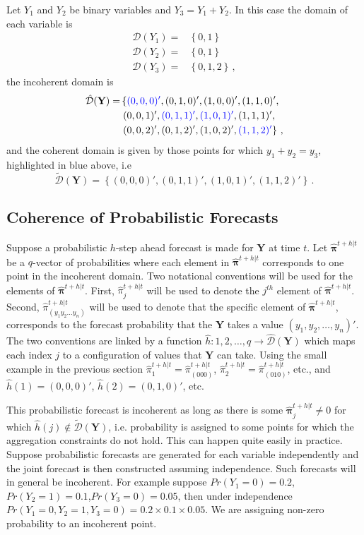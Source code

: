 \documentclass[a4paper,review,12pt,authoryear]{elsarticle}
\newcommand{\bY}{\mathbf{Y}}
\newcommand{\bpi}{\bm{\pi}}
\begin{document}
    Let $Y_1$ and $Y_2$ be binary variables and $Y_3=Y_1+Y_2$. In this case the domain of each variable is
    \begin{align*}
      \mathcal{D}(Y_1)=&\left\{0,1\right\}\\
      \mathcal{D}(Y_2)=&\left\{0,1\right\}\\
      \mathcal{D}(Y_3)=&\left\{0,1,2\right\}\,,
    \end{align*}	
    the incoherent domain is
    \begin{align*}
    \hat{\mathcal D}(\bY)=&\left\{\textcolor{blue}{(0,0,0)'},(0,1,0)',(1,0,0)',(1,1,0)',\right.\\
    &\left.(0,0,1)',\textcolor{blue}{(0,1,1)'},\textcolor{blue}{(1,0,1)'},(1,1,1)',\right.\\
    &\left.(0,0,2)',(0,1,2)',(1,0,2)',\textcolor{blue}{(1,1,2)'}\right\}\,,
    \end{align*}
    and the coherent domain is given by those points for which $y_1+y_2=y_3$, highlighted in blue above, i.e
    \[
        \tilde{\mathcal D}(\bY)=\left\{(0,0,0)',(0,1,1)',(1,0,1)',(1,1,2)'\right\}\,.
    \]
    
    \subsection{Coherence of Probabilistic Forecasts}

    Suppose a probabilistic $h$-step ahead forecast is made for $\bY$ at time $t$. 
    Let $\hat{\bpi}^{t+h|t}$ be a $q$-vector of probabilities where each element in $\hat{\bpi}^{t+h|t}$ corresponds to one point in the incoherent domain. 
    Two notational conventions will be used for the elements of $\hat{\bpi}^{t+h|t}$. 
    First, $\hat{\pi}_j^{t+h|t}$ will be used to denote the $j^{th}$ element of $\hat{\bpi}^{t+h|t}$.  
    Second, $\hat{\pi}_{(y_1 y_2 \dots y_n)}^{t+h|t}$ will be used to denote that the specific element of $\hat{\bpi}^{t+h|t}$, corresponds to the forecast probability that the $\bY$ takes a value $(y_1,y_2,\dots,y_n)'$. The two conventions are linked by a function $\hat{h}:{1,2,\dots,q}\rightarrow\hat{\mathcal{D}}(\bY)$ which maps each index $j$ to a configuration of values that $\bY$ can take. 
    Using the small example in the previous section $\hat{\pi}_1^{t+h|t}=\hat{\pi}_{(000)}^{t+h|t}$, $\hat{\pi}_2^{t+h|t}=\hat{\pi}_{(010)}^{t+h|t}$, etc., and $\hat{h}(1)=(0,0,0)'$, $\hat{h}(2)=(0,1,0)'$, etc.
    
    This probabilistic forecast is incoherent as long as there is some $\hat{\bpi}^{t+h|t}_j\neq 0$ for which $\hat{h}(j)\notin\tilde{\mathcal{D}}(\bY)$, i.e. probability is assigned to some points for which the aggregation constraints do not hold. 
    This can happen quite easily in practice. Suppose probabilistic forecasts are generated for each variable independently and the joint forecast is then constructed assuming independence. 
    Such forecasts will in general be incoherent. 
    For example suppose $Pr(Y_1=0)=0.2$,$Pr(Y_2=1)=0.1$,$Pr(Y_3=0)=0.05$, then under independence $Pr(Y_1=0,Y_2=1,Y_3=0)=0.2\times0.1\times0.05$. We are assigning non-zero probability to an incoherent point.
    
\end{document}
